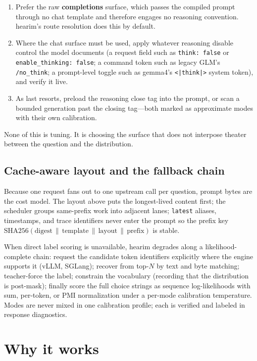 \documentclass[11pt]{article}
\begin{document}
\begin{enumerate}
\item Prefer the raw \textbf{completions} surface, which passes the
compiled prompt through no chat template and therefore engages no
reasoning convention. hearim's route resolution does this by default.
\item Where the chat surface must be used, apply whatever reasoning
disable control the model documents (a request field such as
\texttt{think: false} or \texttt{enable\_thinking: false}; a command
token such as legacy GLM's \texttt{/no\_think}; a prompt-level toggle such
as gemma4's \texttt{<|think|>} system token), and verify it live.
\item As last resorts, preload the reasoning close tag into the prompt, or
scan a bounded generation past the closing tag---both marked as
approximate modes with their own calibration.
\end{enumerate}

None of this is tuning. It is choosing the surface that does not interpose
theater between the question and the distribution.

\subsection{Cache-aware layout and the fallback chain}

Because one request fans out to one upstream call per question, prompt
bytes are the cost model. The layout above puts the longest-lived content
first; the scheduler groups same-prefix work into adjacent lanes;
\texttt{latest} aliases, timestamps, and trace identifiers never enter the
prompt so the prefix key $\mathrm{SHA256}(\text{digest} \,\|\,
\text{template} \,\|\, \text{layout} \,\|\, \text{prefix})$ is stable.

When direct label scoring is unavailable, hearim degrades along a
likelihood-complete chain: request the candidate token identifiers
explicitly where the engine supports it (vLLM, SGLang); recover from
top-$N$ by text and byte matching; teacher-force the label; constrain the
vocabulary (recording that the distribution is post-mask); finally score
the full choice strings as sequence log-likelihoods with sum, per-token,
or PMI normalization under a per-mode calibration temperature. Modes are
never mixed in one calibration profile; each is verified and labeled in
response diagnostics.

\section{Why it works}
\label{sec:why}
\end{document}
